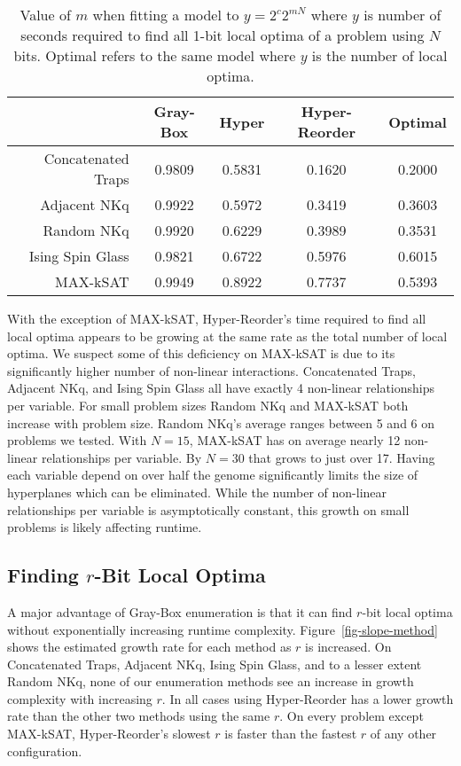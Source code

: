 \documentclass[runningheads,a4paper]{llncs}
\begin{document}
\begin{table}
	\centering
	\caption{Value of $m$ when fitting a model to $y = 2^c2^{mN}$ where $y$ is number of seconds required to
	         find all 1-bit local optima of a problem using $N$ bits. Optimal refers to the same model where
	         $y$ is the number of local optima.}
	\begin{tabular}{|r|c|c|c|c|}
	  \hline
	    & \textbf{Gray-Box} & \textbf{Hyper} & \textbf{Hyper-Reorder} & \textbf{Optimal} \\ \hline
    Concatenated Traps & 0.9809 & 0.5831 & 0.1620 & 0.2000 \\ \hline
    Adjacent NKq & 0.9922 & 0.5972 & 0.3419 & 0.3603 \\ \hline
    Random NKq & 0.9920 & 0.6229 & 0.3989 & 0.3531 \\ \hline
    Ising Spin Glass & 0.9821 & 0.6722 & 0.5976 & 0.6015 \\ \hline
    MAX-kSAT & 0.9949 & 0.8922 & 0.7737 & 0.5393 \\ \hline
  \end{tabular}
  \label{table-scaling}
\end{table}


With the exception of MAX-kSAT, Hyper-Reorder's time required to find all local optima
appears to be growing at the same rate as the total number of local optima. We suspect
some of this deficiency on MAX-kSAT is due to its significantly higher number of non-linear
interactions. Concatenated Traps, Adjacent NKq, and Ising Spin Glass all have exactly 4
non-linear relationships per variable. For small problem sizes
Random NKq and MAX-kSAT both increase with problem
size. Random NKq's average ranges between 5 and 6 on problems we tested.
With $N=15$, MAX-kSAT has on average nearly
12 non-linear relationships per variable. By $N=30$ that grows to just over 17. Having each
variable depend on over half the genome significantly limits the size of hyperplanes which
can be eliminated. While the number of non-linear relationships per variable
is asymptotically constant, this growth on small problems is likely affecting runtime.


\subsection{Finding $r$-Bit Local Optima}
A major advantage of Gray-Box enumeration is that it can find $r$-bit local optima
without exponentially increasing runtime complexity. Figure~\ref{fig-slope-method}
shows the estimated growth rate for each method as $r$ is increased. On Concatenated Traps,
Adjacent NKq, Ising Spin Glass, and to a lesser extent Random NKq, none of our enumeration
methods see an increase in growth complexity with increasing $r$. In all cases using Hyper-Reorder
has a lower growth rate than the other two methods using the same $r$. On every problem
except MAX-kSAT, Hyper-Reorder's slowest $r$ is faster than the fastest $r$
of any other configuration.
\end{document}
